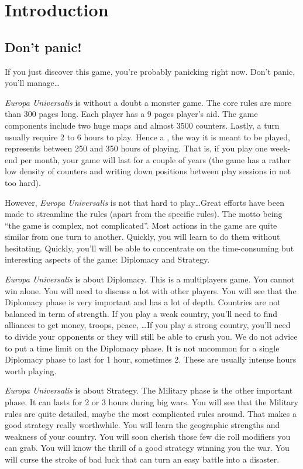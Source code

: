 
\chapter*{Introduction}

\section*{Don't panic!}
If you just discover this game, you're probably panicking right now. Don't
panic, you'll manage\ldots

\emph{Europa Universalis} is without a doubt a monster game. The core rules
are more than 300 pages long. Each player has a 9 pages player's aid. The game
components include two huge maps and almost 3500 counters. Lastly, a turn
usually require 2 to 6 hours to play. Hence a , the way
it is meant to be played, represents between 250 and 350 hours of
playing. That is, if you play one week-end per month, your game will last for
a couple of years (the game has a rather low density of counters and writing
down positions between play sessions in not too hard).

However, \emph{Europa Universalis} is not that hard to play\ldots Great
efforts have been made to streamline the rules (apart from the specific
rules). The motto being ``the game is complex, not complicated''. Most actions
in the game are quite similar from one turn to another. Quickly, you will learn
to do them without hesitating. Quickly, you'll will be able to concentrate on
the time-consuming but interesting aspects of the game: Diplomacy and
Strategy.

\emph{Europa Universalis} is about Diplomacy. This is a multiplayers game. You
cannot win alone. You will need to discuss a lot with other players. You will
see that the Diplomacy phase is very important and has a lot of
depth. Countries are not balanced in term of strength. If you play a weak
country, you'll need to find alliances to get money, troops, peace, \ldots If
you play a strong country, you'll need to divide your opponents or they will
still be able to crush you. We do not advice to put a time limit on the
Diplomacy phase. It is not uncommon for a single Diplomacy phase to last for 1
hour, sometimes 2. These are usually intense hours worth playing.

\emph{Europa Universalis} is about Strategy. The Military phase is the other
important phase. It can lasts for 2 or 3 hours during big wars. You will see
that the Military rules are quite detailed, maybe the most complicated rules
around. That makes a good strategy really worthwhile. You will learn the
geographic strengths and weakness of your country. You will soon cherish those
few  die roll modifiers you can grab. You will know the thrill of a
good strategy winning you the war. You will curse the stroke of bad luck that
can turn an easy battle into a disaster.


